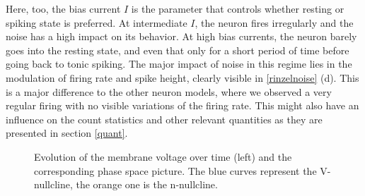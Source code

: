 \documentclass[12pt,a4paper]{article}
\begin{document}
Here, too, the bias current $I$ is the parameter that controls whether resting or spiking state is preferred. At intermediate $I$, the neuron fires irregularly and the noise has a high impact on its behavior. At high bias currents, the neuron barely goes into the resting state, and even that only for a short period of time before going back to tonic spiking. The major impact of noise in this regime lies in the modulation of firing rate and spike height, clearly visible in \ref{rinzelnoise} (d). This is a major difference to the other neuron models, where we observed a very regular firing with no visible variations of the firing rate. This might also have an influence on the count statistics and other relevant quantities as they are presented in section \ref{quant}.

\begin{figure}[H]
	\hspace*{-0.5cm}
	
	\caption{Evolution of the membrane voltage over time (left) and the corresponding phase space picture. The blue curves represent the V-nullcline, the orange one is the n-nullcline. }
	\label{ppcomprinzel}
\end{figure}
\end{document}
